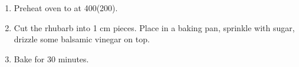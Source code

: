 
\begin{ingredients}
\end{ingredients}


\begin{recipe}
  \begin{enumerate}

  \item Preheat oven to at 400\F (200\C).

  \item Cut the rhubarb into 1 cm pieces.  Place in a baking pan,
    sprinkle with sugar, drizzle some balsamic vinegar on top.

  \item Bake for 30 minutes.

  \end{enumerate}
\end{recipe}
